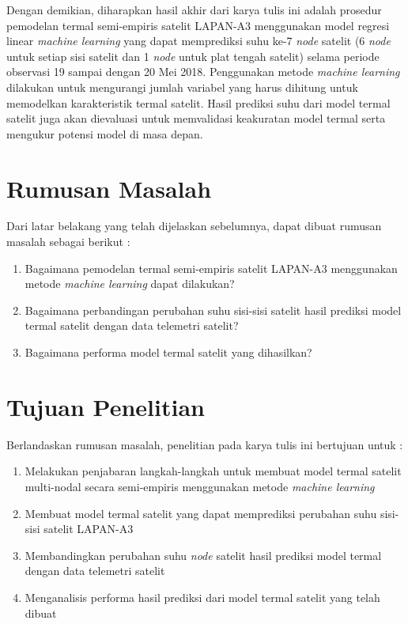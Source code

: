 Dengan demikian, diharapkan hasil akhir dari karya tulis ini adalah prosedur
pemodelan termal semi-empiris satelit LAPAN-A3 menggunakan model regresi linear
\textit{machine learning} yang dapat memprediksi suhu ke-7 \textit{node} satelit (6 \textit{node} untuk
setiap sisi satelit dan 1 \textit{node} untuk plat tengah satelit) selama periode
observasi 19 sampai dengan 20 Mei 2018. Penggunakan metode \textit{machine learning}
dilakukan untuk mengurangi jumlah variabel yang harus dihitung untuk memodelkan
karakteristik termal satelit. Hasil prediksi suhu dari model termal satelit
juga akan dievaluasi untuk memvalidasi keakuratan model termal serta mengukur
potensi model di masa depan.

\section{Rumusan Masalah}

Dari latar belakang yang telah dijelaskan sebelumnya, dapat dibuat rumusan masalah sebagai berikut :

\begin{enumerate}
\item Bagaimana pemodelan termal semi-empiris satelit LAPAN-A3 menggunakan metode \textit{machine learning} dapat dilakukan?
\item Bagaimana perbandingan perubahan suhu sisi-sisi satelit hasil prediksi model termal satelit dengan data telemetri satelit?
\item Bagaimana performa model termal satelit yang dihasilkan?
\end{enumerate}

\section{Tujuan Penelitian}

Berlandaskan rumusan masalah, penelitian pada karya tulis ini bertujuan untuk :

\begin{enumerate}
\item Melakukan penjabaran langkah-langkah untuk membuat model termal satelit multi-nodal secara semi-empiris menggunakan metode \textit{machine learning}
\item Membuat model termal satelit yang dapat memprediksi perubahan suhu sisi-sisi satelit LAPAN-A3
\item Membandingkan perubahan suhu \textit{node} satelit hasil prediksi model termal dengan data telemetri satelit
\item Menganalisis performa hasil prediksi dari model termal satelit yang telah dibuat
\end{enumerate}

